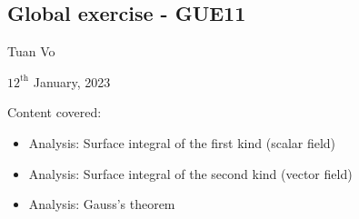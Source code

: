 \documentclass[12pt]{article}
\begin{document}
\begin{center}
	\section*{Global exercise - GUE11}
\end{center}
\begin{center}
	Tuan Vo
\end{center}
\begin{center}
	$12^{\text{th}}$ January, 2023
\end{center}
Content covered:
\begin{itemize}
	\item[\checkmark] Analysis: Surface integral of the first kind (scalar field)
	\item[\checkmark] Analysis: Surface integral of the second kind (vector field)
	\item[\checkmark] Analysis: Gauss's theorem
\end{itemize}
\end{document}
